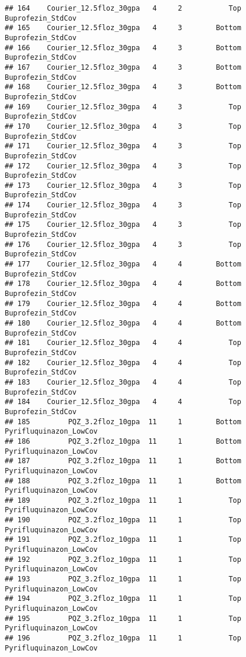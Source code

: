 \documentclass[
]{article}
\begin{document}
\begin{verbatim}
## 164    Courier_12.5floz_30gpa   4     2           Top      Buprofezin_StdCov
## 165    Courier_12.5floz_30gpa   4     3        Bottom      Buprofezin_StdCov
## 166    Courier_12.5floz_30gpa   4     3        Bottom      Buprofezin_StdCov
## 167    Courier_12.5floz_30gpa   4     3        Bottom      Buprofezin_StdCov
## 168    Courier_12.5floz_30gpa   4     3        Bottom      Buprofezin_StdCov
## 169    Courier_12.5floz_30gpa   4     3           Top      Buprofezin_StdCov
## 170    Courier_12.5floz_30gpa   4     3           Top      Buprofezin_StdCov
## 171    Courier_12.5floz_30gpa   4     3           Top      Buprofezin_StdCov
## 172    Courier_12.5floz_30gpa   4     3           Top      Buprofezin_StdCov
## 173    Courier_12.5floz_30gpa   4     3           Top      Buprofezin_StdCov
## 174    Courier_12.5floz_30gpa   4     3           Top      Buprofezin_StdCov
## 175    Courier_12.5floz_30gpa   4     3           Top      Buprofezin_StdCov
## 176    Courier_12.5floz_30gpa   4     3           Top      Buprofezin_StdCov
## 177    Courier_12.5floz_30gpa   4     4        Bottom      Buprofezin_StdCov
## 178    Courier_12.5floz_30gpa   4     4        Bottom      Buprofezin_StdCov
## 179    Courier_12.5floz_30gpa   4     4        Bottom      Buprofezin_StdCov
## 180    Courier_12.5floz_30gpa   4     4        Bottom      Buprofezin_StdCov
## 181    Courier_12.5floz_30gpa   4     4           Top      Buprofezin_StdCov
## 182    Courier_12.5floz_30gpa   4     4           Top      Buprofezin_StdCov
## 183    Courier_12.5floz_30gpa   4     4           Top      Buprofezin_StdCov
## 184    Courier_12.5floz_30gpa   4     4           Top      Buprofezin_StdCov
## 185         PQZ_3.2floz_10gpa  11     1        Bottom Pyrifluquinazon_LowCov
## 186         PQZ_3.2floz_10gpa  11     1        Bottom Pyrifluquinazon_LowCov
## 187         PQZ_3.2floz_10gpa  11     1        Bottom Pyrifluquinazon_LowCov
## 188         PQZ_3.2floz_10gpa  11     1        Bottom Pyrifluquinazon_LowCov
## 189         PQZ_3.2floz_10gpa  11     1           Top Pyrifluquinazon_LowCov
## 190         PQZ_3.2floz_10gpa  11     1           Top Pyrifluquinazon_LowCov
## 191         PQZ_3.2floz_10gpa  11     1           Top Pyrifluquinazon_LowCov
## 192         PQZ_3.2floz_10gpa  11     1           Top Pyrifluquinazon_LowCov
## 193         PQZ_3.2floz_10gpa  11     1           Top Pyrifluquinazon_LowCov
## 194         PQZ_3.2floz_10gpa  11     1           Top Pyrifluquinazon_LowCov
## 195         PQZ_3.2floz_10gpa  11     1           Top Pyrifluquinazon_LowCov
## 196         PQZ_3.2floz_10gpa  11     1           Top Pyrifluquinazon_LowCov

\end{verbatim}
\end{document}

